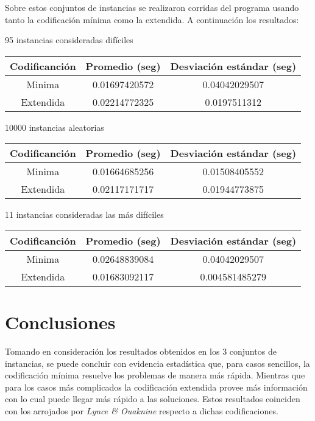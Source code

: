 \documentclass{article}
\begin{document}
Sobre estos conjuntos de instancias se realizaron corridas del programa usando tanto la codificación mínima como la extendida. A continuación los resultados:

\begin{center}

\begin{center}
    95 instancias consideradas difíciles
    \begin{tabular}{| c | c | c |}
        \hline
        Codificanción & Promedio (seg) & Desviación estándar (seg) \\ \hline
        Minima & 0.01697420572 & 0.04042029507 \\ \hline
        Extendida & 0.02214772325 & 0.0197511312 \\ \hline
    \end{tabular}
\end{center}

\begin{center}
    10000 instancias aleatorias
    \begin{tabular}{| c | c | c |}
        \hline
        Codificanción & Promedio (seg) & Desviación estándar (seg) \\ \hline
        Minima & 0.01664685256 & 0.01508405552 \\ \hline
        Extendida & 0.02117171717 & 0.01944773875 \\ \hline
    \end{tabular}
\end{center}

    11 instancias consideradas las más difíciles
    \begin{tabular}{| c | c | c |}
        \hline
        Codificanción & Promedio (seg) & Desviación estándar (seg) \\ \hline
        Minima & 0.02648839084 & 0.04042029507 \\ \hline
        Extendida & 0.01683092117 & 0.004581485279 \\ \hline
    \end{tabular}
\end{center}

\section*{Conclusiones}

Tomando en consideración los resultados obtenidos en los 3 conjuntos de instancias, se puede concluir con evidencia estadística que, para casos sencillos, la codificación mínima resuelve los problemas de manera más rápida. Mientras que para los casos más complicados la codificación extendida provee más información con lo cual puede llegar más rápido a las soluciones. Estos resultados coinciden con los arrojados por \emph{Lynce \& Ouaknine} respecto a dichas codificaciones.
\end{document}
